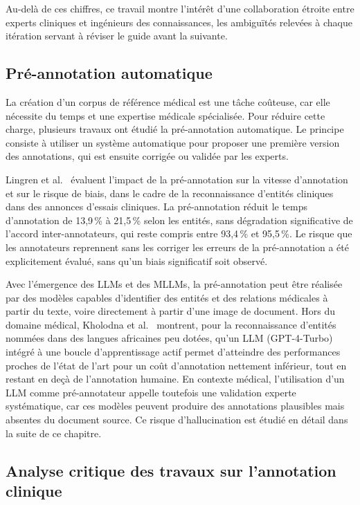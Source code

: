 Au-delà de ces chiffres, ce travail montre l'intérêt d'une collaboration étroite entre experts cliniques et ingénieurs des connaissances, les ambiguïtés relevées à chaque itération servant à réviser le guide avant la suivante.

\subsection{Pré-annotation automatique}

La création d'un corpus de référence médical est une tâche coûteuse, car elle nécessite du temps et une expertise médicale spécialisée. Pour réduire cette charge, plusieurs travaux ont étudié la pré-annotation automatique. Le principe consiste à utiliser un système automatique pour proposer une première version des annotations, qui est ensuite corrigée ou validée par les experts.

Lingren et al.~\cite{lingren2014preannotation} évaluent l'impact de la pré-annotation sur la vitesse d'annotation et sur le risque de biais, dans le cadre de la reconnaissance d'entités cliniques dans des annonces d'essais cliniques. La pré-annotation réduit le temps d'annotation de 13,9\,\% à 21,5\,\% selon les entités, sans dégradation significative de l'accord inter-annotateurs, qui reste compris entre 93,4\,\% et 95,5\,\%. Le risque que les annotateurs reprennent sans les corriger les erreurs de la pré-annotation a été explicitement évalué, sans qu'un biais significatif soit observé.

Avec l'émergence des LLMs et des MLLMs, la pré-annotation peut être réalisée par des modèles capables d'identifier des entités et des relations médicales à partir du texte, voire directement à partir d'une image de document. Hors du domaine médical, Kholodna et al.~\cite{kholodna2024llms} montrent, pour la reconnaissance d'entités nommées dans des langues africaines peu dotées, qu'un LLM (GPT-4-Turbo) intégré à une boucle d'apprentissage actif permet d'atteindre des performances proches de l'état de l'art pour un coût d'annotation nettement inférieur, tout en restant en deçà de l'annotation humaine. En contexte médical, l'utilisation d'un LLM comme pré-annotateur appelle toutefois une validation experte systématique, car ces modèles peuvent produire des annotations plausibles mais absentes du document source. Ce risque d'hallucination est étudié en détail dans la suite de ce chapitre.

\subsection{Analyse critique des travaux sur l'annotation clinique}

